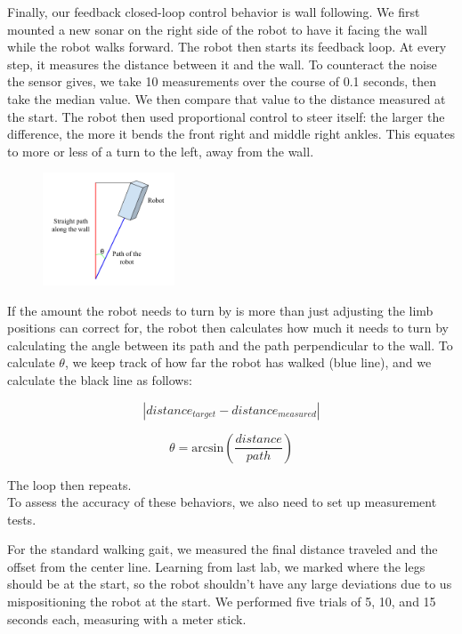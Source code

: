 \documentclass[11pt]{article}
\begin{document}
Finally, our feedback closed-loop control behavior is wall following. We first mounted a new sonar on the right side of the robot to have it facing the wall while the robot walks forward. The robot then starts its feedback loop. At every step, it measures the distance between it and the wall. To counteract the noise the sensor gives, we take 10 measurements over the course of 0.1 seconds, then take the median value. We then compare that value to the distance measured at the start. The robot then used proportional control to steer itself: the larger the difference, the more it bends the front right and middle right ankles. This equates to more or less of a turn to the left, away from the wall. 

\begin{figure}
\includegraphics[width=0.35\textwidth]{trig.png}
\centering
\end{figure}

If the amount the robot needs to turn by is more than just adjusting the limb positions can correct for, the robot then calculates how much it needs to turn by calculating the angle between its path and the path perpendicular to the wall. To calculate $\theta$, we keep track of how far the robot has walked (blue line), and we calculate the black line as follows: 

\[ |distance_{target} - distance_{measured} |\] 

\[\theta = \text{arcsin}(\frac{distance}{path})\]

The loop then repeats. \\



To assess the accuracy of these behaviors, we also need to set up measurement tests. 

For the standard walking gait, we measured the final distance traveled and the offset from the center line. Learning from last lab, we marked where the legs should be at the start, so the robot shouldn't have any large deviations due to us mispositioning the robot at the start. We performed five trials of 5, 10, and 15 seconds each, measuring with a meter stick.
\end{document}
